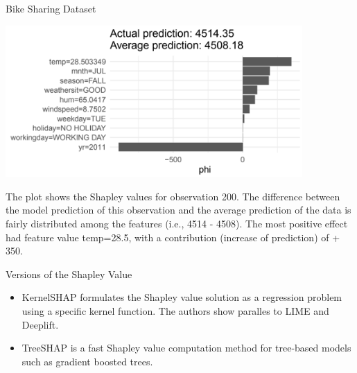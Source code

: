 \documentclass[aspectratio=169]{../latex_main/tntbeamer}  %
\begin{document}
    


\begin{frame}{Bike Sharing Dataset}

\begin{center}
\includegraphics[width=0.85\textwidth]{figure/bike-sharing03.png}
\end{center}

The plot shows the Shapley values for observation 200.
The difference between the model prediction of this observation and the average prediction of the data is fairly distributed among the features (i.e., 4514 - 4508).
The most positive effect had feature value temp=28.5, with a contribution (increase of prediction) of + 350.
\end{frame}

\begin{frame}{Versions of the Shapley Value  }

  \begin{itemize}
  \item KernelSHAP formulates the Shapley value solution as a regression problem using a specific kernel function. The authors show paralles to LIME and Deeplift. 
  \item TreeSHAP is a fast Shapley value computation method for tree-based models such as gradient boosted trees.
 \end{itemize}
\end{frame}
\end{document}
